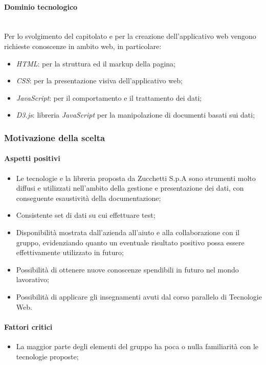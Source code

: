 \documentclass[11pt]{article}
\begin{document}
        \paragraph{Dominio tecnologico}~\\
        
        \noindent
        Per lo svolgimento del capitolato e per la creazione dell'applicativo web vengono richieste conoscenze in ambito web, in
        particolare:
        \begin{itemize}
            \item \textit{HTML}: per la struttura ed il markup della pagina;
            \item \textit{CSS}: per la presentazione visiva dell'applicativo web;
            \item \textit{JavaScript}: per il comportamento e il trattamento dei dati;
            \item \textit{D3.js}: libreria \textit{JavaScript} per la manipolazione di documenti basati sui dati;
        \end{itemize}
    
    \subsubsection{Motivazione della scelta}
        \paragraph{Aspetti positivi}
        \begin{itemize}
            \item Le tecnologie e la libreria proposta da Zucchetti S.p.A sono strumenti molto diffusi e utilizzati nell'ambito della
            gestione e presentazione dei dati, con conseguente esaustività della documentazione;
            \item Consistente set di dati su cui effettuare test;
            \item Disponibilità mostrata dall'azienda all'aiuto e alla collaborazione con il gruppo, evidenziando quanto un eventuale
            risultato positivo possa essere effettivamente utilizzato in futuro;
            \item Possibilità di ottenere nuove conoscenze spendibili in futuro nel mondo lavorativo;
            \item Possibilità di applicare gli insegnamenti avuti dal corso parallelo di Tecnologie Web.
        \end{itemize}
        \paragraph{Fattori critici}
        \begin{itemize}
            \item La maggior parte degli elementi del gruppo ha poca o nulla familiarità con le tecnologie proposte;
        \end{itemize}
    
\end{document}
